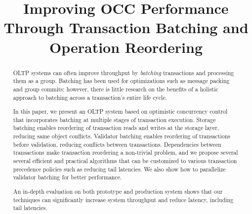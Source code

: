 \documentclass[sigconf]{acmart}
\begin{document}

\title{Improving OCC Performance Through Transaction Batching and Operation Reordering}

%
%

\begin{abstract}
	OLTP systems can often improve throughput by \emph{batching} transactions and processing them as a group. Batching has been used for optimizations such as message packing and group commits; however, there is little research on the benefits of a holistic approach to batching across a transaction's entire life cycle.
	
In this paper, we present an OLTP system based on optimistic concurrency control that incorporates batching at multiple stages of transaction execution. 
Storage batching enables reordering of transaction reads and writes at the storage layer, reducing same object conflicts. Validator batching enables reordering of transactions before validation, reducing conflicts between transactions. Dependencies between transactions make transaction reordering a non-trivial problem, and we propose several several efficient and practical algorithms that can be customized to various transaction precedence policies such as reducing tail latencies. We also show how to parallelize validator batching for better performance. 

An in-depth evaluation on both prototype and production system shows that our techniques can significantly increase system throughput and reduce latency, including tail latencies. 
\end{abstract}

\maketitle



%
%







\end{document}
